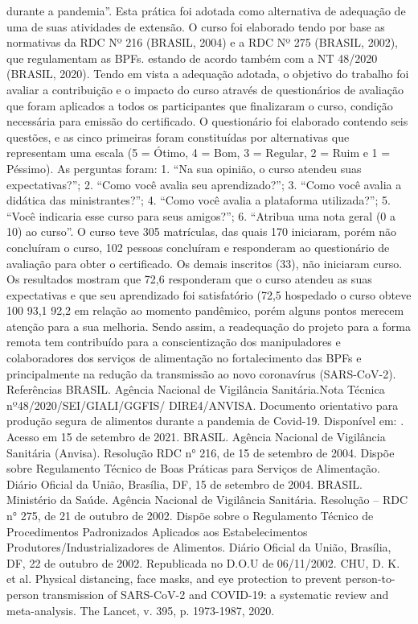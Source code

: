 durante a pandemia”. Esta prática foi adotada como alternativa de adequação de uma de suas 
atividades de extensão. O curso foi elaborado tendo por base as normativas da RDC Nº 216 
(BRASIL, 2004) e a RDC Nº 275 (BRASIL, 2002), que regulamentam as BPFs. estando de acordo 
também com a NT 48/2020 (BRASIL, 2020).
Tendo em vista a adequação adotada, o objetivo do trabalho foi avaliar a contribuição e o impacto 
do curso através de questionários de avaliação que foram aplicados a todos os participantes que 
finalizaram o curso, condição necessária para emissão do certificado.
O questionário foi elaborado contendo seis questões, e as cinco primeiras foram constituídas por 
alternativas que representam uma escala (5 = Ótimo, 4 = Bom, 3 = Regular, 2 = Ruim e 1 = 
Péssimo). As perguntas foram: 1. “Na sua opinião, o curso atendeu suas expectativas?”; 2. “Como 
você avalia seu aprendizado?”; 3. “Como você avalia a didática das ministrantes?”; 4. “Como você 
avalia a plataforma utilizada?”; 5. “Você indicaria esse curso para seus amigos?”; 6. “Atribua uma 
nota geral (0 a 10) ao curso”.
O curso teve 305 matrículas, das quais 170 iniciaram, porém não concluíram o curso, 102 pessoas
concluíram e responderam ao questionário de avaliação para obter o certificado. Os demais 
inscritos (33), não iniciaram curso. Os resultados mostram que 72,6%
responderam que o curso atendeu as suas expectativas e que seu aprendizado foi satisfatório 
(72,5%
hospedado o curso obteve 100%
93,1%
92,2%
em relação ao momento pandêmico, porém alguns pontos merecem atenção para a sua melhoria.
Sendo assim, a readequação do projeto para a forma remota tem contribuído para a conscientização 
dos manipuladores e colaboradores dos serviços de alimentação no fortalecimento das BPFs e 
principalmente na redução da transmissão ao novo coronavírus (SARS-CoV-2).
Referências
BRASIL. Agência Nacional de Vigilância Sanitária.Nota Técnica nº48/2020/SEI/GIALI/GGFIS/
DIRE4/ANVISA. Documento orientativo para produção segura de alimentos durante a pandemia 
de Covid-19. Disponível em: 
. Acesso em 
15 de setembro de 2021.
BRASIL. Agência Nacional de Vigilância Sanitária (Anvisa). Resolução RDC n° 216, de 15
de setembro de 2004. Dispõe sobre Regulamento Técnico de Boas Práticas para Serviços de
Alimentação. Diário Oficial da União, Brasília, DF, 15 de setembro de 2004.
BRASIL. Ministério da Saúde. Agência Nacional de Vigilância Sanitária. Resolução –
RDC n° 275, de 21 de outubro de 2002. Dispõe sobre o Regulamento Técnico de
Procedimentos Padronizados Aplicados aos Estabelecimentos
Produtores/Industrializadores de Alimentos. Diário Oficial da União, Brasília, DF, 22 de
outubro de 2002. Republicada no D.O.U de 06/11/2002.
CHU, D. K. et al. Physical distancing, face masks, and eye protection to prevent person-to-person 
transmission of SARS-CoV-2 and COVID-19: a systematic review and meta-analysis. The Lancet, 
v. 395, p. 1973-1987, 2020. 

